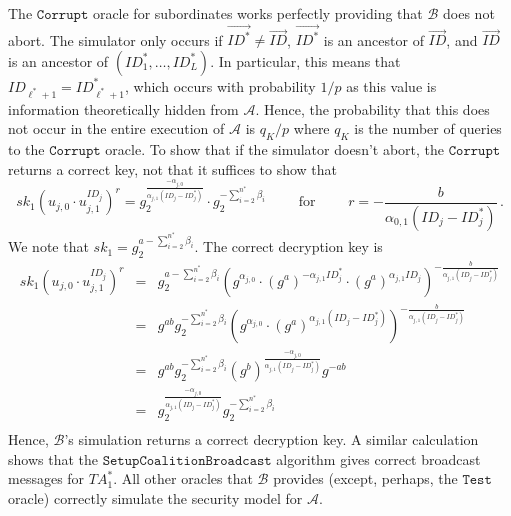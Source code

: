 \documentclass[10pt]{llncs}
\newcommand{\A}{\mathcal{A}}
\newcommand{\B}{\mathcal{B}}
\newcommand{\ID}{\mathit{ID}}
\newcommand{\TA}{\mathit{TA}}
\newcommand{\sk}{\mathit{sk}}
\begin{document}
The $\texttt{Corrupt}$ oracle for subordinates works perfectly providing that $\B$ does not abort. The simulator only occurs if $\vec{\ID^{*}}\neq \vec{\ID}$, $\vec{\ID^{*}}$ is an ancestor of $\vec{\ID}$, and $\vec{\ID}$ is an ancestor of $(\ID^{*}_{1},\ldots,\ID^{*}_{L})$. In particular, this means that $\ID_{\ell^{*}+1} = \ID^{*}_{\ell^{*}+1}$, which occurs with probability $1/p$ as this value is information theoretically hidden from $\A$. Hence, the probability that this does not occur in the entire execution of $\A$ is $q_{K}/p$ where $q_{K}$ is the number of queries to the $\texttt{Corrupt}$ oracle. To show that if the simulator doesn't abort, the $\texttt{Corrupt}$ returns a correct key, not that it suffices to show that 
\begin{displaymath}
\sk_1 \left(u_{j,0}\cdot u_{j,1}^{\ID_{j}}\right)^{r} = g_{2}^{\frac{-\alpha_{j,0}}{\alpha_{j,1}(\ID_{j}-\ID^{*}_{j})}} \cdot g_{2}^{-\sum_{i=2}^{n^{*}} \beta_{i}} \qquad \mbox{ for } \qquad r = -\frac{b}{\alpha_{0,1}(\ID_{j}-\ID^{*}_{j})}\, .
\end{displaymath}
We note that $\sk_1 = g_{2}^{a-\sum_{i=2}^{n^{*}} \beta_{i}}$. The correct decryption key is
\begin{eqnarray*}
\sk_1 \left(u_{j,0}\cdot u_{j,1}^{\ID_{j}}\right)^{r} &=& g_{2}^{a-\sum_{i=2}^{n^{*}} \beta_{i}} \left( g^{\alpha_{j,0}} \cdot (g^{a})^{-\alpha_{j,1}\ID^{*}_{j}} \cdot (g^{a})^{\alpha_{j,1}\ID_{j}} \right)^{-\frac{b}{\alpha_{j,1}(\ID_{j}-\ID^{*}_{j})}}\\
&=& g^{ab} g_{2}^{-\sum_{i=2}^{n^{*}}\beta_{i}} \left( g^{\alpha_{j,0}} \cdot (g^{a})^{\alpha_{j,1}(\ID_{j}-\ID^{*}_{j})} \right)^{-\frac{b}{\alpha_{j,1}(\ID_{j}-\ID^{*}_{j})}} 
\\
&=& g^{ab} g_{2}^{-\sum_{i=2}^{n^{*}}\beta_{i}} (g^{b})^{\frac{-\alpha_{j,0}}{\alpha_{j,1}(\ID_{j}-\ID^{*}_{j})}}g^{-ab}\\
&=& g_{2}^{\frac{-\alpha_{j,0}}{\alpha_{j,1}(\ID_{j}-\ID^{*}_{j})}} g_{2}^{-\sum_{i=2}^{n^{*}}\beta_{i}}\\
\end{eqnarray*}
Hence, $\B$'s simulation returns a correct decryption key. A similar calculation shows that the $\texttt{SetupCoalitionBroadcast}$ algorithm gives correct broadcast messages for $\TA^{*}_{1}$. All other oracles that $\B$ provides (except, perhaps, the $\texttt{Test}$ oracle) correctly simulate the security model for $\A$.
\end{document}

